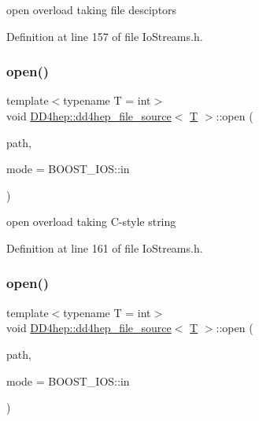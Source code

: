 open overload taking file desciptors 



Definition at line 157 of file Io\+Streams.\+h.

\hypertarget{class_d_d4hep_1_1dd4hep__file__source_ac9d66c792e2fa69fa7c9df98d8d45850}{}\label{class_d_d4hep_1_1dd4hep__file__source_ac9d66c792e2fa69fa7c9df98d8d45850} 
\subsubsection{\texorpdfstring{open()}{open()}\hspace{0.1cm}{\footnotesize\ttfamily [2/4]}}
{\footnotesize\ttfamily template$<$typename T = int$>$ \\
void \hyperlink{class_d_d4hep_1_1dd4hep__file__source}{D\+D4hep\+::dd4hep\+\_\+file\+\_\+source}$<$ \hyperlink{class_t}{T} $>$\+::open (\begin{DoxyParamCaption}\item[{const char $\ast$}]{path,  }\item[{B\+O\+O\+S\+T\+\_\+\+I\+O\+S\+::openmode}]{mode = {\ttfamily BOOST\+\_\+IOS\+:\+:in} }\end{DoxyParamCaption})\hspace{0.3cm}{\ttfamily [inline]}}



open overload taking C-\/style string 



Definition at line 161 of file Io\+Streams.\+h.

\hypertarget{class_d_d4hep_1_1dd4hep__file__source_aae3ce079b4789a40e59a56e2496e6b8b}{}\label{class_d_d4hep_1_1dd4hep__file__source_aae3ce079b4789a40e59a56e2496e6b8b} 
\subsubsection{\texorpdfstring{open()}{open()}\hspace{0.1cm}{\footnotesize\ttfamily [3/4]}}
{\footnotesize\ttfamily template$<$typename T = int$>$ \\
void \hyperlink{class_d_d4hep_1_1dd4hep__file__source}{D\+D4hep\+::dd4hep\+\_\+file\+\_\+source}$<$ \hyperlink{class_t}{T} $>$\+::open (\begin{DoxyParamCaption}\item[{const std\+::string \&}]{path,  }\item[{B\+O\+O\+S\+T\+\_\+\+I\+O\+S\+::openmode}]{mode = {\ttfamily BOOST\+\_\+IOS\+:\+:in} }\end{DoxyParamCaption})\hspace{0.3cm}{\ttfamily [inline]}}



